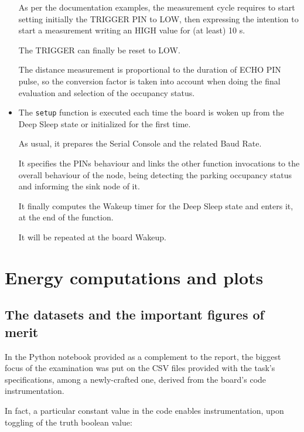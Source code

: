 \documentclass[a4paper,11pt]{article} %
\begin{document}
\begin{itemize}
        As per the documentation examples, the measurement cycle requires to start setting initially the \textsc{TRIGGER} PIN to \textsc{LOW}, then expressing the intention to start a measurement writing an \textsc{HIGH} value for (at least) 10 \mu s.

        The \textsc{TRIGGER} can finally be reset to \textsc{LOW}.

        The distance measurement is proportional to the duration of \textsc{ECHO} PIN pulse, so the conversion factor is taken into account when doing the final evaluation and selection of the occupancy status.

        \label{setup}
        \item The \texttt{setup} function is executed each time the board is woken up from the Deep Sleep state or initialized for the first time.

        As usual, it prepares the Serial Console and the related Baud Rate.

        It specifies the PINs behaviour and links the other function invocations to the overall behaviour of the node, being detecting the parking occupancy status and informing the sink node of it.

        It finally computes the Wakeup timer for the Deep Sleep state and enters it, at the end of the function.

        It will be repeated at the board Wakeup.
    \end{itemize}


    \section{Energy computations and plots}\label{sec:energy-computations-and-plots}

    \subsection{The datasets and the important figures of merit}\label{subsec:the-datasets-and-the-important-figures-of-merit}

    In the Python notebook provided as a complement to the report, the biggest focus of the examination was put on the CSV files provided with the task's specifications, among a newly-crafted one, derived from the board's code instrumentation.

    In fact, a particular constant value in the code enables instrumentation, upon toggling of the truth boolean value:
\end{document}
